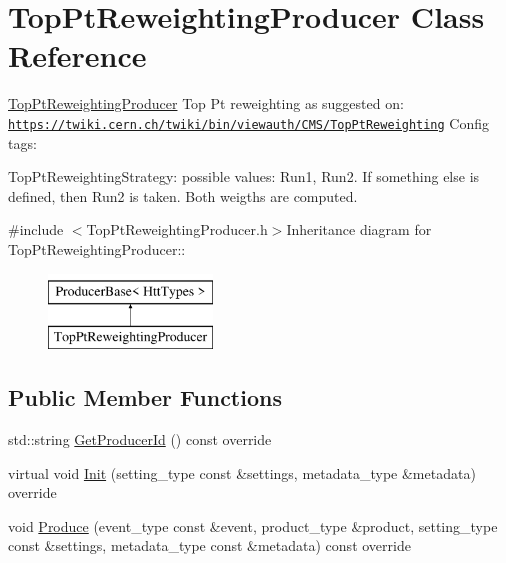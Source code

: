 \hypertarget{classTopPtReweightingProducer}{
\section{TopPtReweightingProducer Class Reference}
\label{classTopPtReweightingProducer}
}


\hyperlink{classTopPtReweightingProducer}{TopPtReweightingProducer} Top Pt reweighting as suggested on: \href{https://twiki.cern.ch/twiki/bin/viewauth/CMS/TopPtReweighting}{\tt https://twiki.cern.ch/twiki/bin/viewauth/CMS/TopPtReweighting} Config tags:
\begin{DoxyItemize}
\item TopPtReweightingStrategy: possible values: Run1, Run2. If something else is defined, then Run2 is taken. Both weigths are computed. 
\end{DoxyItemize} 


{\ttfamily \#include $<$TopPtReweightingProducer.h$>$}Inheritance diagram for TopPtReweightingProducer::\begin{figure}[H]
\begin{center}
\leavevmode
\includegraphics[height=2cm]{classTopPtReweightingProducer}
\end{center}
\end{figure}
\subsection*{Public Member Functions}
\begin{DoxyCompactItemize}
\item 
std::string \hyperlink{classTopPtReweightingProducer_a8fb041235c98ea0209154727d2afec87}{GetProducerId} () const override
\item 
virtual void \hyperlink{classTopPtReweightingProducer_a92085c1110d08e3926513ad967316094}{Init} (setting\_\-type const \&settings, metadata\_\-type \&metadata) override
\item 
void \hyperlink{classTopPtReweightingProducer_a3681934df5c0df3260d894df2a46b790}{Produce} (event\_\-type const \&event, product\_\-type \&product, setting\_\-type const \&settings, metadata\_\-type const \&metadata) const override
\end{DoxyCompactItemize}


